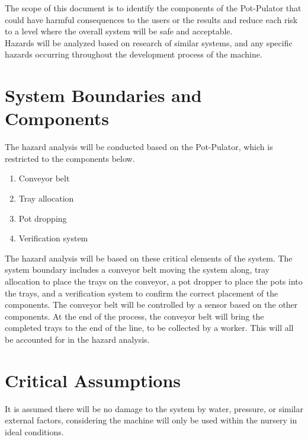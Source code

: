 \documentclass{article}
\begin{document}
\noindent The scope of this document is to identify the components of the Pot-Pulator that could have harmful consequences to the users or the results and reduce each risk to a level where the overall system will be safe and acceptable. 
\\

\noindent Hazards will be analyzed based on research of similar systems, and any specific hazards occurring throughout the development process of the machine. 

\section{System Boundaries and Components}

The hazard analysis will be conducted based on the Pot-Pulator, which is restricted to the components below. 


\begin{enumerate}
    \item Conveyor belt
    \item Tray allocation
    \item Pot dropping
    \item Verification system
\end{enumerate}

\noindent The hazard analysis will be based on these critical elements of the system. The system boundary includes a conveyor belt moving the system along, tray allocation to place the trays on the conveyor, a pot dropper to place the pots into the trays, and a verification system to confirm the correct placement of the components. 
\clearpage
\noindent The conveyor belt will be controlled by a sensor based on the other components. At the end of the process, the conveyor belt will bring the completed trays to the end of the line, to be collected by a worker. This will all be accounted for in the hazard analysis. 

\section{Critical Assumptions}

It is assumed there will be no damage to the system by water, pressure, or similar external factors, considering the machine will only be used within the nursery in ideal conditions.  
\end{document}
